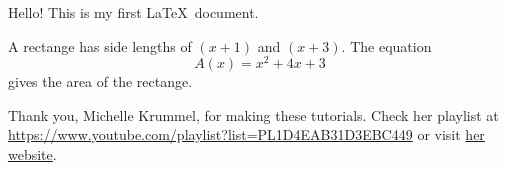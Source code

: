 \documentclass[11pt]{article}
\begin{document}
Hello! This is my first \LaTeX\ document.

A rectange has side lengths of $(x+1)$ and $(x+3)$. The equation $${A(x) = x^2 + 4x + 3}$$ gives the area of the rectange.

Thank you, Michelle Krummel, for making these tutorials. Check her playlist at \url{https://www.youtube.com/playlist?list=PL1D4EAB31D3EBC449} or visit \href{http://michellekrummel.com}{\color{blue}her website}.
\end{document}
